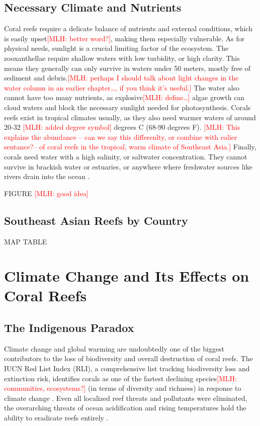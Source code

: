 \documentclass{book}\usepackage{knitr}
\newcommand{\red}[1]{\textcolor{red}{[MLH: #1]}}
\begin{document}
{\subsection{Necessary Climate and Nutrients}

Coral reefs require a delicate balance of nutrients and external conditions, which is easily upset\red{better word?}, making them especially vulnerable. As for physical needs, sunlight is a crucial limiting factor of the ecosystem. The zooxanthellae require shallow waters with low turbidity, or high clarity. This means they generally can only survive in waters under 50 meters, mostly free of sediment and debris.\red{perhaps I should talk about light changes in the water column in an earlier chapter\ldots, if you think it's useful.} The water also cannot have too many nutrients, as explosive\red{define\ldots} algae growth can cloud waters and block the necessary sunlight needed for photosynthesis. Corals reefs exist in tropical climates usually, as they also need warmer waters of around 20-32 \degree \red{added degree symbol} degrees C (68-90 degrees F). \red{This explains the abundance -- can we say this differenlty, or combine with ealier sentance?-- of coral reefs in the tropical, warm climate of Southeast Asia.} Finally, corals need water with a high salinity, or saltwater concentration. They cannot survive in brackish water or estuaries, or anywhere where freshwater sources like rivers drain into the ocean \citep{https://doi.org/10.1002/fee.2088}.

FIGURE \red{good idea}

\subsection{Southeast Asian Reefs by Country}

MAP
TABLE

\section{Climate Change and Its Effects on Coral Reefs}

\subsection{The Indigenous Paradox}

Climate change and global warming are undoubtedly one of the biggest contributors to the loss of biodiversity and overall destruction of coral reefs. The IUCN Red List Index (RLI), a comprehensive list tracking biodiversity loss and extinction risk, identifies corals as one of the fastest declining species\red{communities, ecosystems?} (in terms of diversity and richness) in response to climate change \citep{wwfindex}. Even all localized reef threats and pollutants were eliminated, the overarching threats of ocean acidification and rising temperatures hold the ability to eradicate reefs entirely \citep{Keller2009ClimateCC}.

}
\end{document}
